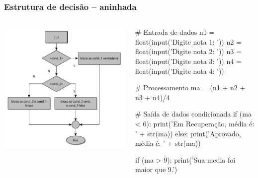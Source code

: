 \documentclass{beamer}
\begin{document}
\begin{frame}[fragile]
\frametitle{Estrutura de decisão -- aninhada}

\begin{columns}
	\begin{column}{0.5\textwidth}	
	\center \includegraphics[scale=0.35]{./figures/if-nested.pdf}
	\end{column}

\begin{column}{0.5\textwidth}  %
\begin{python}
# Entrada de dados
n1 = float(input('Digite nota 1: '))
n2 = float(input('Digite nota 2: '))
n3 = float(input('Digite nota 3: '))
n4 = float(input('Digite nota 4: '))

# Processamento
ma = (n1 + n2 + n3 + n4)/4

# Saída de dados condicionada
if (ma < 6):
    print('Em Recuperação, média é: ' + str(ma))
else:
    print('Aprovado, média é: ' + str(ma))
    
    if (ma > 9):
        print('Sua media foi maior que 9.')
\end{python}  
\end{column}
\end{columns}
\end{frame}
\end{document}
